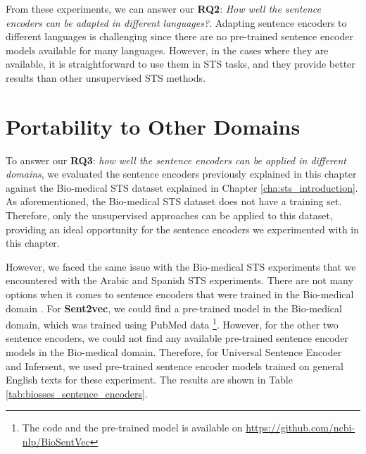 From these experiments, we can answer our \textbf{RQ2}: \textit{How well the sentence encoders can be adapted in different languages?}. Adapting sentence encoders to different languages is challenging since there are no pre-trained sentence encoder models available for many languages. However, in the cases where they are available, it is straightforward to use them in STS tasks, and they provide better results than other unsupervised STS methods. 


\section{Portability to Other Domains}
\label{sec:sentence_domains}

To answer our \textbf{RQ3}: \textit{how well the sentence encoders can be applied in different domains}, we evaluated the sentence encoders previously explained in this chapter against the Bio-medical STS dataset explained in Chapter \ref{cha:sts_introduction}. As aforementioned, the Bio-medical STS dataset does not have a training set. Therefore, only the unsupervised approaches can be applied to this dataset, providing an ideal opportunity for the sentence encoders we experimented with in this chapter. 

However, we faced the same issue with the Bio-medical STS experiments that we encountered with the Arabic and Spanish STS experiments. There are not many options when it comes to sentence encoders that were trained in the Bio-medical domain \autocite{TAWFIK2020103396}. For \textbf{Sent2vec}, we could find a pre-trained model in the Bio-medical domain, which was trained using PubMed data \autocite{8904728}\footnote{The code and the pre-trained model is available on \url{https://github.com/ncbi-nlp/BioSentVec}}. However, for the other two sentence encoders, we could not find any available pre-trained sentence encoder models in the Bio-medical domain. Therefore, for Universal Sentence Encoder and Infersent, we used pre-trained sentence encoder models trained on general English texts for these experiment. The results are shown in Table \ref{tab:biosses_sentence_encoders}.

